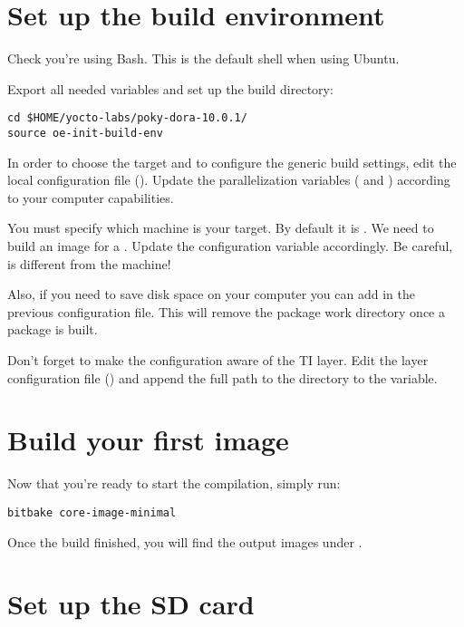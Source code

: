 \section{Set up the build environment}

Check you're using Bash. This is the default shell when using Ubuntu.

Export all needed variables and set up the build directory:
\begin{verbatim}
cd $HOME/yocto-labs/poky-dora-10.0.1/
source oe-init-build-env
\end{verbatim}

In order to choose the target and to configure the generic build settings,
edit the local configuration file ().
Update the parallelization variables ( and
) according to your computer capabilities.

You must specify which machine is your target. By default it
is . We need to build an image for a .
Update the  configuration variable accordingly. Be
careful,  is different from the 
machine!

Also, if you need to save disk space on your computer you can add  in the previous configuration file. This will remove the
package work directory once a package is built.

Don't forget to make the configuration aware of the TI layer. Edit the
layer configuration file () and append the
full path to the  directory to the  variable.

\section{Build your first image}

Now that you're ready to start the compilation, simply run:
\begin{verbatim}
bitbake core-image-minimal
\end{verbatim}

Once the build finished, you will find the output images under
.

\section{Set up the SD card}

